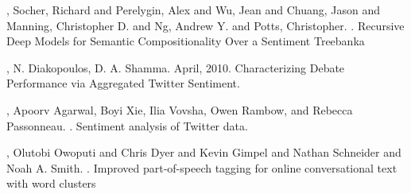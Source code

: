 %
%


\begin{thebibliography}{}

%
%
%
%


,
Socher, Richard  and  Perelygin, Alex  and  Wu, Jean  and  Chuang, Jason  and  Manning, Christopher D.  and  Ng, Andrew Y.  and  Potts, Christopher. 
. 
\newblock Recursive Deep Models for Semantic Compositionality Over a Sentiment Treebanka

,
N. Diakopoulos, D. A. Shamma. 
\newblock April, 2010.
\newblock Characterizing Debate Performance via Aggregated Twitter Sentiment.

,
Apoorv Agarwal, Boyi Xie, Ilia Vovsha, Owen Rambow, and Rebecca Passonneau. 
. 
\newblock Sentiment analysis of Twitter data. 

,
Olutobi Owoputi and Chris Dyer and Kevin Gimpel and Nathan Schneider and Noah A. Smith. 
. 
\newblock Improved part-of-speech tagging for online conversational text with word clusters



\end{thebibliography}











